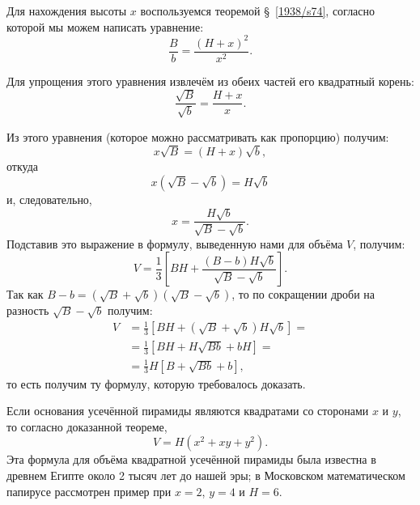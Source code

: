 Для нахождения высоты $x$ воспользуемся теоремой §~\ref{1938/s74}, согласно которой мы можем написать уравнение:
\[\frac Bb=\frac{(H+x)^2}{x^2}.\]

Для упрощения этого уравнения извлечём из обеих частей его квадратный корень:
\[\frac {\sqrt{B}}{\sqrt{b}}=\frac{H+x}{x}.\]

Из этого уравнения (которое можно рассматривать как пропорцию) получим:
\[x\sqrt{B}=(H+x)\sqrt{b},\]
откуда
\[x(\sqrt{B}-\sqrt{b})=H\sqrt{b}\]
и, следовательно,
\[x=\frac{H\sqrt{b}}{\sqrt{B}-\sqrt{b}}.\]
Подставив это выражение в формулу, выведенную нами для объёма $V$, получим:
\[V=\frac13\left[BH+\frac{(B-b)H\sqrt{b}}{\sqrt{B}-\sqrt{b}}\right].\]
Так как $B - b= (\sqrt{B} + \sqrt{b})(\sqrt{B} - \sqrt{b})$, то по сокращении дроби на разность $\sqrt{B} - \sqrt{b}$ получим:
\begin{align*}
V&=\frac13\left[BH+(\sqrt{B}+\sqrt{b})H\sqrt{b}\right]=
\\
&=\frac13\left[BH+H\sqrt{Bb}+bH\right]=
\\
&=\frac13 H\left[B+\sqrt{Bb}+b\right],
\end{align*}
то есть получим ту формулу, которую требовалось доказать.


{\small

\medskip

Если основания усечённой пирамиды являются квадратами со сторонами $x$ и $y$, то согласно доказанной теореме, 
\[V=H(x^2+xy+y^2).\]
Эта формула для объёма квадратной усечённой пирамиды была известна в древнем Египте около 2 тысяч лет до нашей эры; в Московском математическом папирусе рассмотрен пример при $x=2$, $y=4$ и $H=6$.

}


